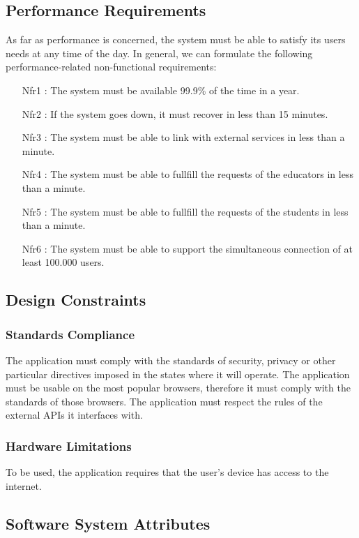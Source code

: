 \documentclass[a4paper, 11pt, titlepage]{article}
\begin{document}
\subsection{Performance Requirements}
As far as performance is concerned, the system must be able to satisfy its users needs at any
time of the day.
In general, we can formulate the following performance-related non-functional requirements:
\begin{itemize}
    \item [Nfr1 :] The system must be available 99.9\% of the time in a year.
    \item [Nfr2 :] If the system goes down, it must recover in less than 15 minutes.
    \item [Nfr3 :] The system must be able to link with external services in less than a minute.
    \item [Nfr4 :] The system must be able to fullfill the requests of the educators in less than a minute.
    \item [Nfr5 :] The system must be able to fullfill the requests of the students in less than a minute.
    \item [Nfr6 :] The system must be able to support the simultaneous connection of at least 100.000
users.
\end{itemize}
\subsection{Design Constraints}

\subsubsection{Standards Compliance}
The application must comply with the standards of security, privacy or other particular directives imposed in the states where it will operate.
The application must be usable on the most popular browsers, therefore it must comply with
the standards of those browsers.
The application must respect the rules of the external APIs it interfaces with.

\subsubsection{Hardware Limitations}
To be used, the application requires that the user’s device has access to the internet.

\subsection{Software System Attributes}
\end{document}
